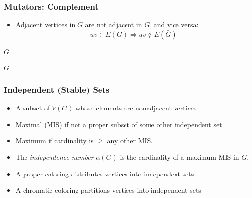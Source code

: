 \documentclass{beamer}
\renewcommand{\a}{\alpha}
\begin{document}
\begin{frame}
  \frametitle{Mutators: Complement}
  \begin{itemize}
  \item Adjacent vertices in \(G\) are not adjacent in \(\bar{G}\), and vice versa:
    \[uv\in E(G)\iff uv\notin E(\bar{G})\]
  \end{itemize}

  \bigskip

  \begin{center}
    \begin{minipage}{2in}
      \centering

      \bigskip

      \(G\)
    \end{minipage}
    \begin{minipage}{2in}
      \centering

      \bigskip

      \(\bar{G}\)
    \end{minipage}
  \end{center}
\end{frame}

\begin{frame}
  \frametitle{Independent (Stable) Sets}
  \begin{itemize}
  \item A subset of \(V(G)\) whose elements are nonadjacent vertices.
  \item Maximal (MIS) if not a proper subset of some other independent set.
  \item Maximum if cardinality is \(\ge\) any other MIS.
  \item The \emph{independence number} \(\a(G)\) is the cardinality of a maximum MIS in \(G\).
  \item A proper coloring distributes vertices into independent sets.
  \item A chromatic coloring partitions vertices into independent sets.
  \end{itemize}
\end{frame}
\end{document}
